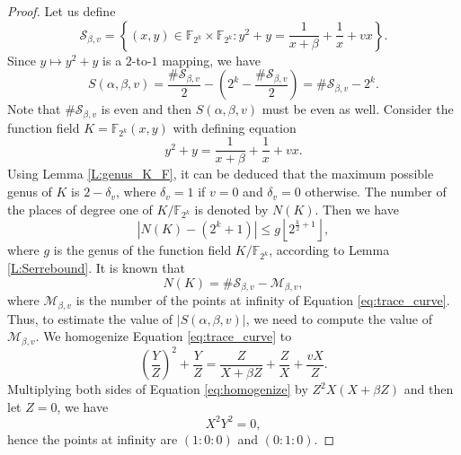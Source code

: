 \documentclass[preprint,10pt]{elsarticle}
\newcommand{\F}{\mathbb{F}}
\newcommand{\0}{\textbf{0}}
\newcommand{\1}{\textbf{1}}
\theoremstyle{plain}
\begin{document}
\begin{proof}
        Let us define  
        \[\mathcal{S}_{\beta,v}=\left\{(x,y)\in\F_{2^k}\times\F_{2^k} : y^2+y=\frac{1}{x+\beta}+\frac{1}{x}+vx\right\}.\]
        Since $y\mapsto y^2+y$ is a $2$-to-$1$ mapping, we have
        \begin{equation}\label{eq:tracesum_S}
            S(\alpha,\beta,v)=\frac{\#\mathcal{S}_{\beta,v}}{2}-\left(2^k-\frac{\#\mathcal{S}_{\beta,v}}{2}\right)=\#\mathcal{S}_{\beta,v}-2^k.
        \end{equation}
        Note that $\#\mathcal{S}_{\beta,v}$ is even and then $S(\alpha,\beta,v)$ must be even as well.
        Consider  the function field $K=\F_{2^k}(x,y)$ with defining equation
        \begin{equation}\label{eq:trace_curve}
            y^2+y=\frac{1}{x+\beta}+\frac{1}{x}+vx.
        \end{equation}
        Using Lemma \ref{L:genus_K_F}, it can be deduced that the maximum possible genus of $K$ is $2-\delta_v$,
        where $\delta_v=1$ if $v=0$ and $\delta_v=0$ otherwise.
        The number of the places of degree one of $K/\F_{2^k}$ is denoted by $N(K)$.
        Then we have
        \begin{equation}\label{eq:N_genus_inequality}
            \left\lvert N(K)-(2^k+1)\right\rvert\le g\left\lfloor 2^{\frac{k}{2}+1}\right\rfloor,
        \end{equation}
        where $g$ is the genus of the function field $K/\F_{2^k}$, according to Lemma \ref{L:Serrebound}.
        It is known that
         \begin{equation}\label{eq:N_S_M_equality}
            N(K)=\#\mathcal{S}_{\beta,v}-\mathcal{M}_{\beta,v},
        \end{equation}
        where $\mathcal{M}_{\beta,v}$ is the number of the points at infinity of Equation \eqref{eq:trace_curve}.
        Thus, to estimate the value of $|S(\alpha,\beta,v)|$, we need to compute the value of $\mathcal{M}_{\beta,v}$.
        We homogenize Equation \eqref{eq:trace_curve} to
        \begin{equation}\label{eq:homogenize}
            \left( \frac{Y}{Z} \right)^2+\frac{Y}{Z}=\frac{Z}{X+\beta Z}+\frac{Z}{X}+\frac{vX}{Z}.
        \end{equation}
        Multiplying both sides of Equation \eqref{eq:homogenize} by $Z^2X\left( X+\beta Z \right)$ and then let $Z=0$,
        we have
        \[X^2Y^2=0,\]
        hence the points at infinity are $(1:0:0)$ and $(0:1:0)$.


\end{proof}
\end{document}
